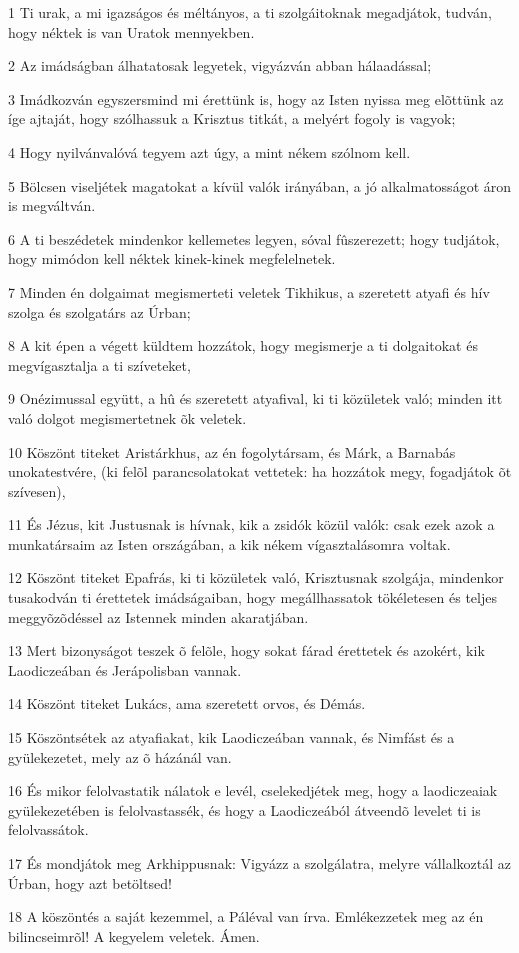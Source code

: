 \par 1 Ti urak, a mi igazságos és méltányos, a ti szolgáitoknak megadjátok, tudván, hogy néktek is van Uratok mennyekben.
\par 2 Az imádságban álhatatosak legyetek, vigyázván abban hálaadással;
\par 3 Imádkozván egyszersmind mi érettünk is, hogy az Isten nyissa meg elõttünk az íge ajtaját, hogy szólhassuk a Krisztus titkát, a melyért fogoly is vagyok;
\par 4 Hogy nyilvánvalóvá tegyem azt úgy, a mint nékem szólnom kell.
\par 5 Bölcsen viseljétek magatokat a kívül valók irányában, a jó alkalmatosságot áron is megváltván.
\par 6 A ti beszédetek mindenkor kellemetes legyen, sóval fûszerezett; hogy tudjátok, hogy mimódon kell néktek kinek-kinek megfelelnetek.
\par 7 Minden én dolgaimat megismerteti veletek Tikhikus, a szeretett atyafi és hív szolga és szolgatárs az Úrban;
\par 8 A kit épen a végett küldtem hozzátok, hogy megismerje a ti dolgaitokat és megvígasztalja a ti szíveteket,
\par 9 Onézimussal együtt, a hû és szeretett atyafival, ki ti közületek való; minden itt való dolgot megismertetnek õk veletek.
\par 10 Köszönt titeket Aristárkhus, az én fogolytársam, és Márk, a Barnabás unokatestvére, (ki felõl parancsolatokat vettetek: ha hozzátok megy, fogadjátok õt szívesen),
\par 11 És Jézus, kit Justusnak is hívnak, kik a zsidók közül valók: csak ezek azok a munkatársaim az Isten országában, a kik nékem vígasztalásomra voltak.
\par 12 Köszönt titeket Epafrás, ki ti közületek való, Krisztusnak szolgája, mindenkor tusakodván ti érettetek imádságaiban, hogy megállhassatok tökéletesen és teljes meggyõzõdéssel az Istennek minden akaratjában.
\par 13 Mert bizonyságot teszek õ felõle, hogy sokat fárad érettetek és azokért, kik Laodiczeában és Jerápolisban vannak.
\par 14 Köszönt titeket Lukács, ama szeretett orvos, és Démás.
\par 15 Köszöntsétek az atyafiakat, kik Laodiczeában vannak, és Nimfást és a gyülekezetet, mely az õ házánál van.
\par 16 És mikor felolvastatik nálatok e levél, cselekedjétek meg, hogy a laodiczeaiak gyülekezetében is felolvastassék, és hogy a Laodiczeából átveendõ levelet ti is felolvassátok.
\par 17 És mondjátok meg Arkhippusnak: Vigyázz a szolgálatra, melyre vállalkoztál az Úrban, hogy azt betöltsed!
\par 18 A köszöntés a saját kezemmel, a Páléval van írva. Emlékezzetek meg az én bilincseimrõl! A kegyelem veletek. Ámen.


